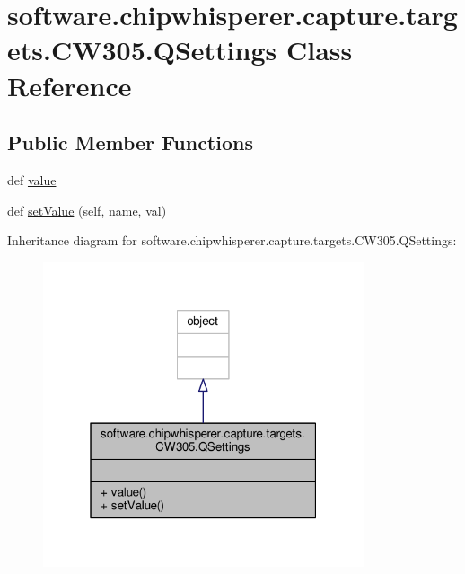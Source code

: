 \hypertarget{classsoftware_1_1chipwhisperer_1_1capture_1_1targets_1_1CW305_1_1QSettings}{}\section{software.\+chipwhisperer.\+capture.\+targets.\+C\+W305.\+Q\+Settings Class Reference}
\label{classsoftware_1_1chipwhisperer_1_1capture_1_1targets_1_1CW305_1_1QSettings}
\subsection*{Public Member Functions}
\begin{DoxyCompactItemize}
\item 
def \hyperlink{classsoftware_1_1chipwhisperer_1_1capture_1_1targets_1_1CW305_1_1QSettings_a0b1db1a0fdb7057db3a6ffd24845d257}{value}
\item 
def \hyperlink{classsoftware_1_1chipwhisperer_1_1capture_1_1targets_1_1CW305_1_1QSettings_a093d60964be76298749ac67b469f6c92}{set\+Value} (self, name, val)
\end{DoxyCompactItemize}


Inheritance diagram for software.\+chipwhisperer.\+capture.\+targets.\+C\+W305.\+Q\+Settings\+:\nopagebreak
\begin{figure}[H]
\begin{center}
\leavevmode
\includegraphics[width=268pt]{d7/db6/classsoftware_1_1chipwhisperer_1_1capture_1_1targets_1_1CW305_1_1QSettings__inherit__graph}
\end{center}
\end{figure}



